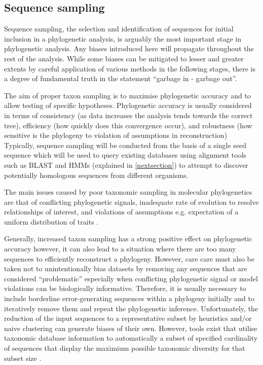 \subsection{Sequence sampling}
Sequence sampling, the selection and identification of sequences for initial inclusion in a 
phylogenetic analysis, is arguably the most important stage in phylogenetic analysis.
Any biases introduced here will propagate throughout the rest of the analysis. 
While some biases can be mitigated to lesser and greater extents 
by careful application of various methods in the following
stages, there is a degree of fundamental truth in the statement ``garbage in - garbage out''.

The aim of proper taxon sampling is to maximise phylogenetic accuracy and to allow
testing of specific hypotheses. 
Phylogenetic accuracy is usually considered in terms of consistency (as data increases 
    the analysis tends towards the correct tree), efficiency (how quickly does this convergence
occur), and robustness (how sensitive is the phylogeny to violation of assumptions in reconstruction) \citep{Nabhan2012}
Typically, sequence sampling will be conducted from the basis of a single
seed sequence which will be used to query existing databases using alignment 
tools such as BLAST and HMMs (explained in \ref{nextsection}) to attempt to discover
potentially homologous sequences from different organisms.  


The main issues caused by poor taxonomic sampling in molecular phylogenetics are that
of conflicting phylogenetic signals, inadequate rate of evolution to resolve relationships
of interest, and violations of assumptions e.g. expectation of a uniform distribution of traits \citep{Nabhan2012}.


Generally, increased taxon sampling has a strong positive effect on phylogenetic accuracy \citep{Zwickl2002}
however, it can also lead to a situation where there are too many sequences to efficiently
reconstruct a phylogeny.
However, care care must also be taken not to unintentionally bias datasets by removing 
any sequences that are considered ``problematic'' especially when conflicting phylogenetic signal
or model violations can be biologically informative.  Therefore, it is usually necessary to include
borderline error-generating sequences within a phylogeny initially and to iteratively remove them
and repeat the phylogenetic inference.  Unfortunately, the reduction of the input sequences
to a representative subset by heuristics and/or naive clustering can generate
biases of their own.  However, tools exist that utilise taxonomic database 
information to automatically a subset of specified cardinality of sequences 
that display the maximium possible taxonomic diversity for that subset size \citep{Zhou2014}.


